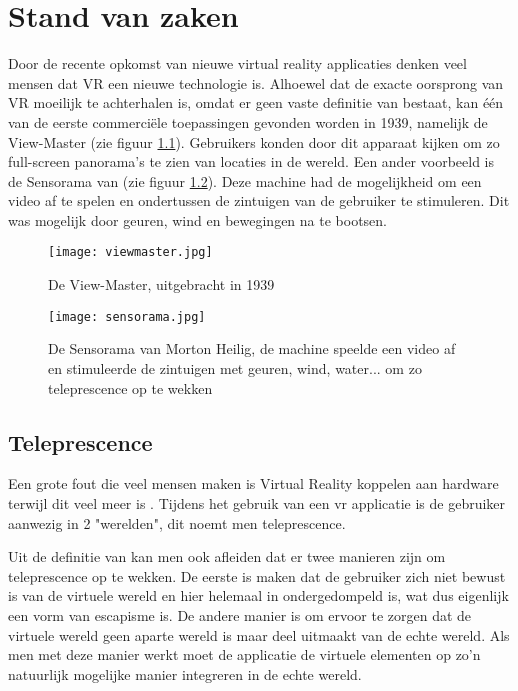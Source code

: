 \chapter{Stand van zaken}
\label{ch:stand-van-zaken}



Door de recente opkomst van nieuwe virtual reality applicaties denken veel mensen dat VR een nieuwe technologie is. Alhoewel dat de exacte oorsprong van VR moeilijk te achterhalen is, omdat er geen vaste definitie van bestaat, kan één van de eerste commerciële toepassingen gevonden worden in 1939, namelijk de View-Master (zie figuur \ref{fig:viewmaster}). Gebruikers konden door dit apparaat kijken om zo full-screen panorama's te zien van locaties in de wereld. Een ander voorbeeld is de Sensorama van \autocite{Heilig1962} (zie figuur \ref{fig:sensorama}). Deze machine had de mogelijkheid om een video af te spelen en ondertussen de zintuigen van de gebruiker te stimuleren. Dit was mogelijk door geuren, wind en bewegingen na te bootsen.
\begin{figure}
    \texttt{[image: viewmaster.jpg]}
    \caption{De View-Master, uitgebracht in 1939 \autocite{ViewMaster}}
    \label{fig:viewmaster}
\end{figure}

\begin{figure}
    \texttt{[image: sensorama.jpg]}
    \caption{De Sensorama van Morton Heilig, de machine speelde een video af en stimuleerde de zintuigen met geuren, wind, water... om zo teleprescence op te wekken \autocite{Chen2015}}
    \label{fig:sensorama}
\end{figure}

\section{Teleprescence}
Een grote fout die veel mensen maken is Virtual Reality koppelen aan hardware terwijl dit veel meer is \autocite{Steuer1992}. 
Tijdens het gebruik van een \acrshort{vr} applicatie is de gebruiker aanwezig in 2 "werelden", dit noemt men teleprescence.

Uit de definitie van \autocite{Steuer1992} kan men ook afleiden dat er twee manieren zijn om teleprescence op te wekken. De eerste is maken dat de gebruiker zich niet bewust is van de virtuele wereld en hier helemaal in ondergedompeld is, wat dus eigenlijk een vorm van escapisme is. De andere manier is om ervoor te zorgen dat de virtuele wereld geen aparte wereld is maar deel uitmaakt van de echte wereld. Als men met deze manier werkt moet de applicatie de virtuele elementen op zo'n natuurlijk mogelijke manier integreren in de echte wereld. 

